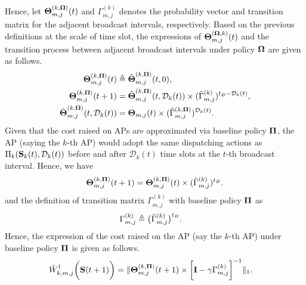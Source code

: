 Hence, let ${\boldsymbol{\Theta}}^{(k, \boldsymbol{\Omega})}_{m,j}(t)$ and ${\Gamma}^{(k)}_{m,j}$ denotes the probability vector and transition matrix for the adjacent broadcast intervals, respectively.
Based on the previous definitions at the scale of time slot, the expressions of $\boldsymbol{\Theta}^{(\boldsymbol{\Omega}, k)}_{m,j}(t)$ and the transition process between adjacent broadcast intervals under policy $\boldsymbol{\Omega}$ are given as follows.
\begin{align}
    \boldsymbol{\Theta}^{(k, \boldsymbol{\Omega})}_{m,j}(t) &\triangleq \hat{\boldsymbol{\Theta}}^{(k, \boldsymbol{\Omega})}_{m,j}(t,0),
    \\
    \boldsymbol{\Theta}^{(k, \boldsymbol{\Omega})}_{m,j}(t+1) &= \hat{\boldsymbol{\Theta}}^{(k, \boldsymbol{\Omega})}_{m,j}(t, \mathcal{D}_{k}(t)) \times (\hat{\Gamma}^{(k)}_{m,j})^{t_B-\mathcal{D}_{k}(t)},
    \nonumber\\
    \hat{\boldsymbol{\Theta}}^{(k, \boldsymbol{\Omega})}_{m,j}(t, \mathcal{D}_{k}(t)) &= \boldsymbol{\Theta}_{m,j}(t) \times (\hat{\Gamma}^{(k, \boldsymbol{\Omega})}_{m,j})^{\mathcal{D}_{k}(t)}.
\end{align}
Given that the cost raised on APs are approximated via baseline policy $\boldsymbol{\Pi}$, the AP (saying the $k$-th AP) would adopt the same dispatching actions as $\Pi_{k}(\mathbf{S}_{k}(t), \mathcal{D}_{k}(t))$ before and after $\mathcal{D}_{k}(t)$ time slots at the $t$-th broadcast interval.
Hence, we have
\begin{align}
    \boldsymbol{\Theta}^{(k,\boldsymbol{\Pi})}_{m,j}(t+1) = \boldsymbol{\Theta}^{(k,\boldsymbol{\Pi})}_{m,j}(t) \times (\hat{\Gamma}^{(k)}_{m,j})^{t_B}.
\end{align}
and the definition of transition matrix $\Gamma^{(k)}_{m,j}$ with baseline policy $\boldsymbol{\Pi}$ as
\begin{align}
    \Gamma^{(k)}_{m,j} &\triangleq \big( \hat{\Gamma}^{(k)}_{m,j} \big)^{t_B}.
\end{align}
Hence, the expression of the cost raised on the AP (say the $k$-th AP) under baseline policy $\boldsymbol{\Pi}$ is given as follows.
\begin{align}
    &\tilde{W}^{\dagger}_{k,m,j}\bigg(\mathbf{S}(t+1)\bigg) =
    \lVert
        \boldsymbol{\Theta}^{(k, \boldsymbol{\Pi})}_{m,j}(t+1) \times
        \bigg[
            \mathbf{I} - \gamma \Gamma^{(k)}_{m,j}
        \bigg]^{-1}
    \|_1.
\end{align}


